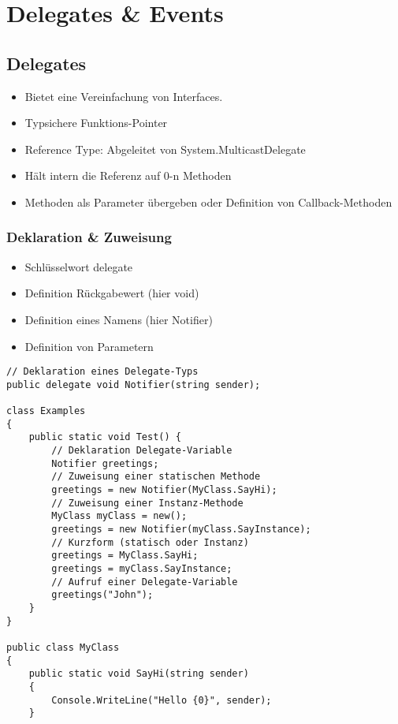 \section{Delegates \& Events}

\begin{multicols*}{2}

\subsection{Delegates}
\begin{itemize}
    \item Bietet eine Vereinfachung von Interfaces. 
    \item Typsichere Funktions-Pointer
    \item Reference Type: Abgeleitet von System.MulticastDelegate
    \item Hält intern die Referenz auf 0-n Methoden
    \item {} Methoden als Parameter übergeben oder Definition von Callback-Methoden
\end{itemize}
\subsubsection{Deklaration \& Zuweisung}
\begin{itemize}
    \item Schlüsselwort delegate
    \item Definition Rückgabewert (hier void)
    \item Definition eines Namens (hier Notifier)
    \item Definition von Parametern
\end{itemize}
\begin{lstlisting}
// Deklaration eines Delegate-Typs
public delegate void Notifier(string sender);

class Examples
{
    public static void Test() {
        // Deklaration Delegate-Variable
        Notifier greetings;
        // Zuweisung einer statischen Methode
        greetings = new Notifier(MyClass.SayHi);
        // Zuweisung einer Instanz-Methode
        MyClass myClass = new();
        greetings = new Notifier(myClass.SayInstance);
        // Kurzform (statisch oder Instanz)
        greetings = MyClass.SayHi;
        greetings = myClass.SayInstance;
        // Aufruf einer Delegate-Variable
        greetings("John");
    }
}

public class MyClass
{
    public static void SayHi(string sender)
    {
        Console.WriteLine("Hello {0}", sender); 
    }


\end{lstlisting}
\end{multicols*}
